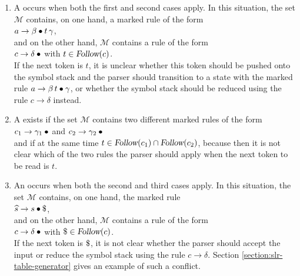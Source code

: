 \begin{enumerate}
\item A  occurs when both the first and second cases
      apply. In this situation, the set \(\mathcal{M}\) contains, on one hand, a marked rule of the form 
      \\[0.2cm]
      \hspace*{1.3cm}
      \(a \rightarrow \beta \mdot t\, \gamma\),
      \\[0.2cm]
      and on the other hand, \(\mathcal{M}\) contains a rule of the form
      \\[0.2cm]
      \hspace*{1.3cm}
      \(c \rightarrow \delta \mdot\) \quad with \(t \in \textsl{Follow}(c)\).
      \\[0.2cm]
      If the next token is \(t\), it is unclear whether this token should be pushed onto the symbol stack and
      the parser should transition to a state with the marked rule  
      \(a \rightarrow \beta\, t \mdot \gamma\), or whether the symbol stack should be reduced using the rule
      \(c \rightarrow \delta\) instead. 
\item A  exists if the set \(\mathcal{M}\) contains two different marked rules of the form
      \\[0.2cm]
      \hspace*{1.3cm}
      \(c_1 \rightarrow \gamma_1 \mdot\) \quad  and \quad \(c_2 \rightarrow \gamma_2 \mdot\)
      \\[0.2cm]
      and if at the same time \(t \in \textsl{Follow}(c_1) \cap \textsl{Follow}(c_2)\), because then it is not clear which
      of the two rules the parser should apply when the next token to be read is \(t\).
\item An  occurs when both the second and third
      cases apply.  In this situation, the set \(\mathcal{M}\) contains, on one hand, the marked rule
      \\[0.2cm]
      \hspace*{1.3cm}
      \(\widehat{s} \rightarrow s \mdot \symbol{36}\),
      \\[0.2cm]
      and on the other hand, \(\mathcal{M}\) contains a rule of the form
      \\[0.2cm]
      \hspace*{1.3cm}
      \(c \rightarrow \delta \mdot\) \quad with \(\symbol{36} \in \textsl{Follow}(c)\).
      \\[0.2cm]
      If the next token is \(\symbol{36}\), it is not clear whether the parser should accept the input or
      reduce the symbol stack using the rule \(c \rightarrow \delta\).  Section
      \ref{section:slr-table-generator} gives an example of such a conflict.
\end{enumerate}

